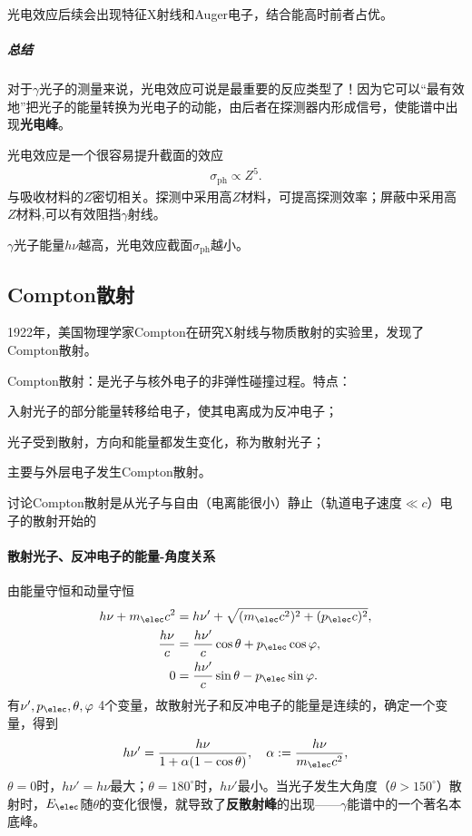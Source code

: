 光电效应后续会出现特征X射线和Auger电子，结合能高时前者占优。

\subparagraph{总结}
对于$\gamma$光子的测量来说，光电效应可说是最重要的反应类型了！因为它可以“最有效地”把光子的能量转换为光电子的动能，由后者在探测器内形成信号，使能谱中出现\textbf{光电峰}。

光电效应是一个很容易提升截面的效应
\begin{align}
	\sigma_{\mathrm{ph}}\propto Z^5.
\end{align}
与吸收材料的$Z$密切相关。探测中采用高$Z$材料，可提高探测效率；屏蔽中采用高$Z$材料,可以有效阻挡$\gamma$射线。

$\gamma$光子能量$h\nu$越高，光电效应截面$\sigma_{\mathrm{ph}}$越小。

\subsection{Compton散射}

1922年，美国物理学家Compton在研究X射线与物质散射的实验里，发现了Compton散射。

Compton散射：是光子与核外电子的非弹性碰撞过程。特点：
\begin{compactenum}
	\item 入射光子的部分能量转移给电子，使其电离成为反冲电子；
	\item 光子受到散射，方向和能量都发生变化，称为散射光子；
	\item 主要与外层电子发生Compton散射。
\end{compactenum}
讨论Compton散射是从光子与自由（电离能很小）静止（轨道电子速度$\ll c$）电子的散射开始的
\paragraph{散射光子、反冲电子的能量-角度关系}由能量守恒和动量守恒
\begin{align*}
	h\nu+m_\elec c^2&=h\nu'+\sqrt{(m_\elec c^2)^2+(p_\elec c)^2},\\
	\frac{h\nu}c&=\frac{h\nu'}c\cos\theta+p_\elec\cos\varphi,\\
	0&=\frac{h\nu'}c\sin\theta-p_\elec\sin\varphi.
\end{align*}
有$\nu',p_\elec,\theta,\varphi$ 4个变量，故散射光子和反冲电子的能量是连续的，确定一个变量，得到
\begin{align}\label{Compton-hnu}
	h\nu'=\frac{h\nu}{1+\alpha(1-\cos\theta)},\quad \alpha:=\frac{h\nu}{m_\elec c^2},
\end{align}
$\theta=0$时，$h\nu'=h\nu$最大；$\theta=180^\circ$时，$h\nu'$最小。当光子发生大角度（$\theta>150^\circ$）散射时，$E_\elec$随$\theta$的变化很慢，就导致了\textbf{反散射峰}的出现——$\gamma$能谱中的一个著名本底峰。

